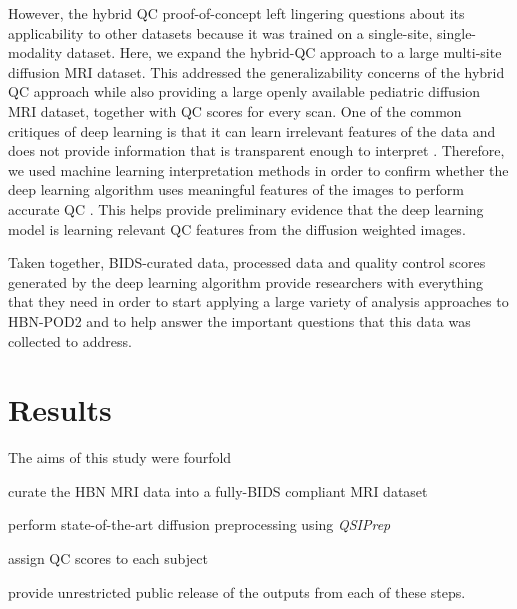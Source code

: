 \documentclass[fleqn,10pt]{wlscirep}
\begin{document}
However, the hybrid QC proof-of-concept left lingering questions about its
applicability to other datasets because it was trained on a single-site,
single-modality dataset.  Here, we expand the hybrid-QC approach to a large
multi-site diffusion MRI dataset. This addressed the generalizability concerns
of the hybrid QC approach while also providing a large openly available
pediatric diffusion MRI dataset, together with QC scores for every scan.  
One of the common critiques of deep learning is that it can learn irrelevant features of the data and does not provide information
that is transparent enough to interpret \cite{lipton2017doctor,
salahuddin2022transparency, Zech2018-ki}.
Therefore, we used machine learning interpretation methods in order to confirm
whether the deep learning algorithm uses meaningful features of the images to
perform accurate QC \cite{sundararajan2017axiomatic,murdoch2019definitions}. This 
helps  provide preliminary evidence that the deep learning model is learning relevant QC features from the diffusion weighted images.

Taken together, BIDS-curated data, processed data and quality control scores
generated by the deep learning algorithm provide researchers with everything
that they need in order to start applying a large variety of analysis approaches
to HBN-POD2 and to help answer the important questions that this data was
collected to address.


\section*{Results}

The aims of this study were fourfold
\begin{enumerate*}[%
    label=(\roman*),%
    before=\unskip{: },%
    itemjoin={{, }},%
    itemjoin*={{, and }}]
    \item curate the HBN MRI data into a fully-BIDS compliant MRI dataset
    \item perform state-of-the-art diffusion preprocessing using \emph{QSIPrep}
    \item assign QC scores to each subject
    \item provide unrestricted public release of the outputs from each of these
    steps.
\end{enumerate*}
\end{document}
